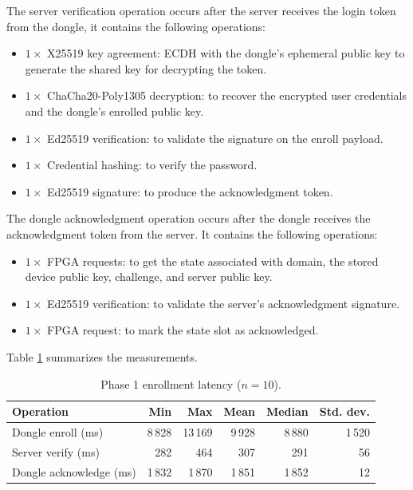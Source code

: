 The server verification operation occurs after the server receives the login token from the dongle, it contains the following operations:
\begin{itemize}
    \item $1\times$ X25519 key agreement: ECDH with the dongle's ephemeral public key to generate the shared key for decrypting the token.
    \item $1\times$ ChaCha20-Poly1305 decryption: to recover the encrypted user credentials and the dongle's enrolled public key.
    \item $1\times$ Ed25519 verification: to validate the signature on the enroll payload.
    \item $1\times$ Credential hashing: to verify the password.
    \item $1\times$ Ed25519 signature: to produce the acknowledgment token.
\end{itemize}

The dongle acknowledgment operation occurs after the dongle receives the acknowledgment token from the server. It contains the following operations:
\begin{itemize}
    \item $1\times$ FPGA requests: to get the state associated with domain, the stored device public key, challenge, and server public key.
    \item $1\times$ Ed25519 verification: to validate the server's acknowledgment signature.
    \item $1\times$ FPGA request: to mark the state slot as acknowledged.
\end{itemize}

Table \ref{tab:perf-phase1} summarizes the measurements.

\begin{table}[ht!]
\centering
\caption{Phase 1 enrollment latency ($n=10$).}
\begin{tabular}{lrrrrr}
\hline
\textbf{Operation} & \textbf{Min} & \textbf{Max} & \textbf{Mean} & \textbf{Median} & \textbf{Std. dev.} \\
\hline
Dongle enroll (ms)      & 8\,828 & 13\,169 & 9\,928 & 8\,880 & 1\,520 \\
Server verify (ms)      &   282  &    464  &   307  &   291  &    56  \\
Dongle acknowledge (ms) & 1\,832 &  1\,870 & 1\,851 & 1\,852 &    12  \\
\hline
\end{tabular}
\label{tab:perf-phase1}
\end{table}

